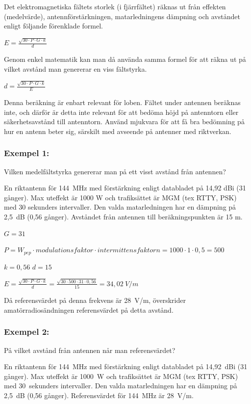 Det elektromagnetiska fältets storlek (i fjärrfältet) räknas ut från
effekten (medelvärde), antennförstärkningen, matarledningens dämpning
och avståndet enligt följande förenklade formel.

\(E=\frac{\sqrt{30 \cdot P \cdot G \cdot k}}{d}\)

Genom enkel matematik kan man då använda samma formel för att räkna
ut på vilket avstånd man genererar en viss fältstyrka.

\(d=\frac{\sqrt{30 \cdot P \cdot G \cdot k}}{E}\)

Denna beräkning är enbart relevant för loben. Fältet under antennen
beräknas inte, och därför är detta inte relevant för att bedöma höjd
på antenntorn eller säkerhetsavstånd till antenntorn. Använd mjukvara för
att få bra bedömning på hur en antenn beter sig, särskilt med avseende på
antenner med riktverkan.

\subsubsection{Exempel 1:}

Vilken medelfältstyrka genererar man på ett visst avstånd från antennen?

En riktantenn för 144~MHz med förstärkning enligt databladet på
14,92 dBi (31 gånger).
Max uteffekt är 1000 W och trafiksättet är MGM (tex RTTY, PSK) med
30 sekunders intervaller.
Den valda matarledningen har en dämpning på 2,5~dB (0,56 gånger).
Avståndet från antennen till beräkningspunkten är 15 m.

\(G = 31\)

\(P = W_{pep} \cdot modulationsfaktor \cdot intermittensfaktorn
= 1000 \cdot 1 \cdot 0,5 = 500\)

\(k = 0,56\)
\(d = 15\)

\(E = \frac{\sqrt{30 \cdot P \cdot G \cdot k}}{d}
= \frac{\sqrt{30 \cdot 500 \cdot 31 \cdot 0,56}}{15}
= 34,02\ V/m\)

Då referensvärdet på denna frekvens är 28~V/m, överskrider
amatörradiosändningen referensvärdet på detta avstånd.

\subsubsection{Exempel 2:}

På vilket avstånd från antennen når man referensvärdet?

En riktantenn för 144~MHz med förstärkning enligt databladet på
14,92~dBi (31 gånger).
Max uteffekt är 1000~W och trafiksättet är MGM (tex RTTY, PSK) med
30~sekunders intervaller.
Den valda matarledningen har en dämpning på 2,5~dB (0,56 gånger).
Referensvärdet för 144~MHz är 28~V/m.


